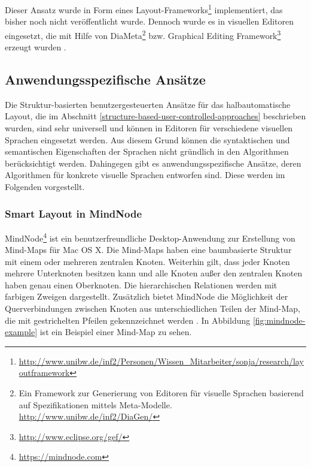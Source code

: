 





Dieser Ansatz wurde in Form eines Layout-Frameworks\footnote{\url{http://www.unibw.de/inf2/Personen/Wissen_Mitarbeiter/sonja/research/layoutframework}} implementiert, das bisher noch nicht veröffentlicht wurde. Dennoch wurde es in visuellen Editoren eingesetzt, die mit Hilfe von DiaMeta\footnote{Ein Framework zur Generierung von Editoren für visuelle Sprachen basierend auf Spezifikationen mittels Meta-Modelle. \url{http://www.unibw.de/inf2/DiaGen/}} bzw. Graphical Editing Framework\footnote{\url{http://www.eclipse.org/gef/}} erzeugt wurden \cite{Maier12A-Pattern-based}.

\subsection{Anwendungsspezifische Ansätze}

Die Struktur-basierten benutzergesteuerten Ansätze für das halbautomatische Layout, die im Abschnitt \ref{structure-based-user-controlled-approaches} beschrieben wurden, sind sehr universell und können in Editoren für verschiedene visuellen Sprachen eingesetzt werden. Aus diesem Grund können die syntaktischen und semantischen Eigenschaften der Sprachen nicht gründlich in den Algorithmen berücksichtigt werden. Dahingegen gibt es anwendungsspezifische Ansätze, deren Algorithmen für konkrete visuelle Sprachen entworfen sind. Diese werden im Folgenden vorgestellt.

\subsubsection{Smart Layout in MindNode}

MindNode\footnote{\url{https://mindnode.com}} ist ein benutzerfreundliche Desktop-Anwendung zur Erstellung von Mind-Maps für Mac OS X. Die Mind-Maps haben eine baumbasierte Struktur mit einem oder mehreren zentralen Knoten. Weiterhin gilt, dass jeder Knoten mehrere Unterknoten besitzen kann und alle Knoten außer den zentralen Knoten haben genau einen Oberknoten. Die hierarchischen Relationen werden mit farbigen Zweigen dargestellt. Zusätzlich bietet MindNode die Möglichkeit der Querverbindungen zwischen Knoten aus unterschiedlichen Teilen der Mind-Map, die mit gestrichelten Pfeilen gekennzeichnet werden \cite{14MindNode}. In Abbildung \ref{fig:mindnode-example} ist ein Beispiel einer Mind-Map zu sehen.

